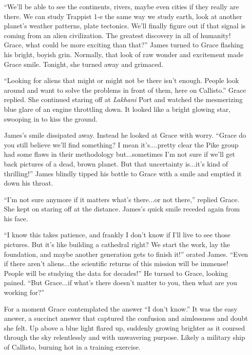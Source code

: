 \documentclass[openany, 12pt]{book} %
\begin{document}
``We'll be able to see the continents, rivers, maybe even cities if they really are there. We can study Trappist 1-e the same way we study earth, look at another planet's weather patterns, plate tectonics. We'll finally figure out if that signal is coming from an alien civilization. The greatest discovery in all of humanity! Grace, what could be more exciting than that?'' James turned to Grace flashing his bright, boyish grin. Normally, that look of raw wonder and excitement made Grace smile. Tonight, she turned away and grimaced.

``Looking for aliens that might or might not be there isn't enough. People look around and want to solve the problems in front of them, here on Callisto.'' Grace replied. She continued staring off at \textit{Lakhani} Port and watched the mesmerizing blue glare of an engine throttling down. It looked like a bright glowing star, swooping in to kiss the ground.

James's smile dissipated away. Instead he looked at Grace with worry. ``Grace do you still believe we'll find something? I mean it's....pretty clear the Pike group had some flaws in their methodology but...sometimes I'm not sure if we'll get back pictures of a dead, brown planet. But that uncertainty is...it's kind of thrilling!'' James blindly tipped his bottle to Grace with a smile and emptied it down his throat.

``I'm not sure anymore if it matters what's there...or not there,'' replied Grace. She kept on staring off at the distance. James's quick smile receded again from his face.

``I know this takes patience, and frankly I don't know if I'll live to see those pictures. But it's like building a cathedral right? We start the work, lay the foundation, and maybe another generation gets to finish it!'' orated James. ``Even if there aren't aliens...the scientific returns of this mission will be immense! People will be studying the data for decades!'' He turned to Grace, looking pained. ``But Grace...if what's there doesn't matter to you, then what are you working for?'' 

For a moment Grace contemplated the answer ``I don't know.'' It was the easy answer, a succinct answer that captured the confusion and aimlessness and doubt she felt. Up above a blue light flared up, suddenly growing brighter as it coursed through the sky relentlessly and with unwavering purpose. Likely a military ship of Callisto, burning hot in a training exercise. 
\end{document}
